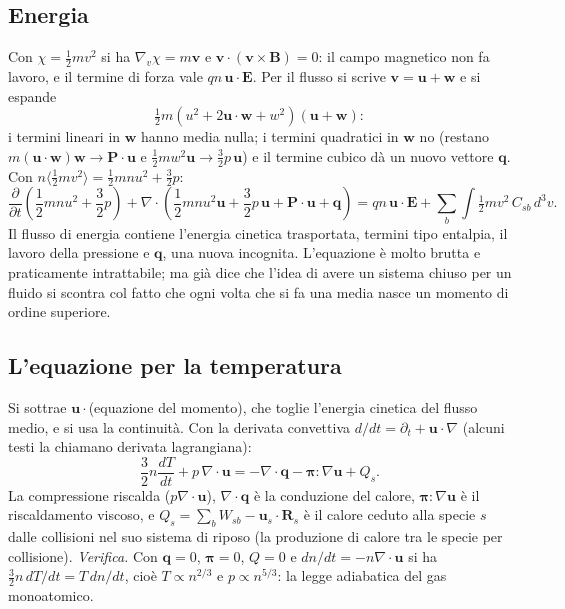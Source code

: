 \subsection{Energia}
Con $\chi=\frac12mv^2$ si ha $\nabla_v\chi=m\mathbf{v}$ e $\mathbf{v}\cdot(\mathbf{v}\times\mathbf{B})=0$: il campo magnetico non fa lavoro, e il termine di forza vale $qn\,\mathbf{u}\cdot\mathbf{E}$. Per il flusso si scrive $\mathbf{v}=\mathbf{u}+\mathbf{w}$ e si espande
\begin{equation}
\tfrac12m(u^2+2\mathbf{u}\cdot\mathbf{w}+w^2)(\mathbf{u}+\mathbf{w}):
\end{equation}
i termini lineari in $\mathbf{w}$ hanno media nulla; i termini quadratici in $\mathbf{w}$ no (restano $m(\mathbf{u}\cdot\mathbf{w})\mathbf{w}\to\mathbf{P}\cdot\mathbf{u}$ e $\frac12mw^2\mathbf{u}\to\frac32p\,\mathbf{u}$) e il termine cubico dà un nuovo vettore $\mathbf{q}$. Con $n\langle\frac12mv^2\rangle=\frac12mnu^2+\frac32p$:
\begin{equation}
\frac{\partial}{\partial t}\left(\frac12mnu^2+\frac32p\right)+\nabla\cdot\left(\frac12mnu^2\mathbf{u}+\frac32p\,\mathbf{u}+\mathbf{P}\cdot\mathbf{u}+\mathbf{q}\right)=qn\,\mathbf{u}\cdot\mathbf{E}+\sum_b\int\tfrac12mv^2\,C_{sb}\,d^3v .
\end{equation}
Il flusso di energia contiene l'energia cinetica trasportata, termini tipo entalpia, il lavoro della pressione e $\mathbf{q}$, una nuova incognita. L'equazione è molto brutta e praticamente intrattabile; ma già dice che l'idea di avere un sistema chiuso per un fluido si scontra col fatto che ogni volta che si fa una media nasce un momento di ordine superiore.

\subsection{L'equazione per la temperatura}
Si sottrae $\mathbf{u}\cdot$(equazione del momento), che toglie l'energia cinetica del flusso medio, e si usa la continuità. Con la derivata convettiva $d/dt=\partial_t+\mathbf{u}\cdot\nabla$ (alcuni testi la chiamano derivata lagrangiana):
\begin{equation}
\frac32n\frac{dT}{dt}+p\,\nabla\cdot\mathbf{u}=-\nabla\cdot\mathbf{q}-\boldsymbol\pi:\nabla\mathbf{u}+Q_s .
\end{equation}
La compressione riscalda ($p\nabla\cdot\mathbf{u}$), $\nabla\cdot\mathbf{q}$ è la conduzione del calore, $\boldsymbol\pi:\nabla\mathbf{u}$ è il riscaldamento viscoso, e $Q_s=\sum_bW_{sb}-\mathbf{u}_s\cdot\mathbf{R}_s$ è il calore ceduto alla specie $s$ dalle collisioni nel suo sistema di riposo (la produzione di calore tra le specie per collisione).
\emph{Verifica.} Con $\mathbf{q}=0$, $\boldsymbol\pi=0$, $Q=0$ e $dn/dt=-n\nabla\cdot\mathbf{u}$ si ha $\frac32n\,dT/dt=T\,dn/dt$, cioè $T\propto n^{2/3}$ e $p\propto n^{5/3}$: la legge adiabatica del gas monoatomico.

